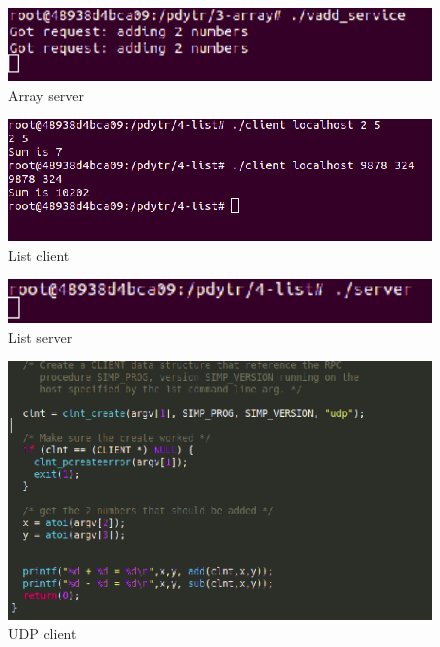 \documentclass[12pt,journal,compsoc]{IEEEtran}
\begin{document}
\begin{figure}[H]
\centering
\includegraphics[width=125mm]{capturas/3-array-server.png}
\caption{Array server}
\label{fig:3-array-server}
\end{figure}

\begin{figure}[H]
\centering
\includegraphics[width=125mm]{capturas/4-list-client.png}
\caption{List client}
\label{fig:4-list-client}
\end{figure}

\begin{figure}[H]
\centering
\includegraphics[width=125mm]{capturas/4-list-server.png}
\caption{List server}
\label{fig:4-list-server}
\end{figure}

\begin{figure}[H]
\centering
\includegraphics[width=125mm]{capturas/udp-client.png}
\caption{UDP client}
\label{fig:udp-client}
\end{figure}
\end{document}
